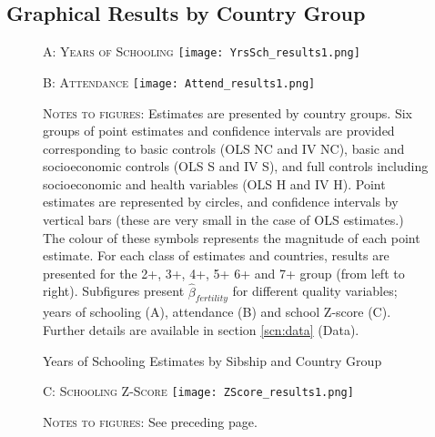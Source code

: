 \documentclass{article}[11pt,subeqn]
\begin{document}
\begin{spacing}{1.5}
\section{Graphical Results by Country Group}
\label{scn:Graphs}
\begin{figure}[!htbp]
\caption{Years of Schooling Estimates by Sibship and Country Group}
\label{fig:YrS}
\begin{center}
\vspace{-4mm}
\textsc{A: Years of Schooling}
\texttt{[image: YrsSch\_results1.png]}
\end{center}
\begin{center}
\vspace{4mm}
\textsc{B: Attendance}
\texttt{[image: Attend\_results1.png]}
\end{center}
\begin{footnotesize}\textsc{ Notes to figures:} Estimates are presented by country groups.  Six groups of point estimates and confidence intervals 
are provided corresponding to basic controls (OLS NC and IV NC), basic and socioeconomic controls (OLS S and IV S), and full controls including 
socioeconomic and health variables (OLS H and IV H).  Point estimates are represented by circles, and confidence intervals by vertical bars (these 
are very small in the case of OLS estimates.)  The colour of these symbols represents the magnitude of each point estimate.  For each class of 
estimates and countries, results are presented for the 2+, 3+, 4+, 5+ 6+ and 7+ group (from left to right).  Subfigures present $\hat{\beta}_{fertility}$ 
for different quality variables; years of schooling (A), attendance (B) and school Z-score (C).  Further details are available in section 
\ref{scn:data} (Data).  \end{footnotesize}
\end{figure}

\begin{figure}[!htbp]
\begin{center}
\vspace{4mm}
\textsc{C: Schooling Z-Score}
\texttt{[image: ZScore\_results1.png]}
\end{center}
\begin{footnotesize}\textsc{ Notes to figures:} See preceding page. \end{footnotesize}
\end{figure}
\end{spacing}
\end{document}
